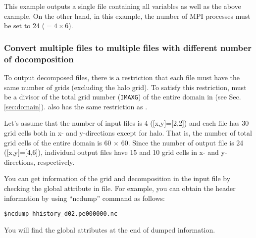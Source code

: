 This example outputs a single file containing all variables as well as the above example.
On the other hand, in this example, the number of MPI processes must be set to 24 ($=4\times6$).



\subsubsection{Convert multiple \scalenetcdf files to multiple \scalenetcdf files with different number of docomposition}
%

To output decomposed files, there is a restriction that each file must have the same number of grids (excluding the halo grid).
To satisfy this restriction,  must be a divisor of the total grid number (\verb|IMAXG|)
of the entire domain in {\XDIR} (see Sec. \ref{sec:domain}).
 also has the same restriction as .


Let's assume that the number of input files is 4 ([x,y]=[2,2])
and each file has 30 grid cells both in x- and y-directions except for halo.
That is, the number of total grid cells of the entire domain is 60 $\times$ 60.
%
Since the number of output file is 24 ([x,y]=[4,6]),
individual output files have 15 and 10 grid cells in x- and y-directions, respectively.


You can get information of the grid and decomposition in the input file by checking the global attribute in \scalenetcdf file.
For example, you can obtain the header information by using ``ncdump'' command as follows:

\begin{alltt}
  \$  ncdump -h history_d02.pe000000.nc
\end{alltt}

You will find the global attributes at the end of dumped information.

